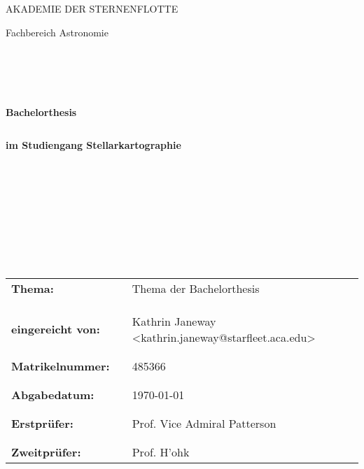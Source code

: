 \begin{titlepage}
	\begin{center}
		\uppercase{\large Akademie der Sternenflotte}\\
	\end{center}
	\begin{center}
		\large Fachbereich Astronomie
	\end{center}
	\begin{verbatim}





	\end{verbatim}
	\begin{center}
		\textbf{\large Bachelorthesis}
	\end{center}
	\begin{verbatim}
	\end{verbatim}
	\begin{center}
		\textbf{im Studiengang Stellarkartographie}
	\end{center}
	\begin{verbatim}










	\end{verbatim}
	\begin{flushleft}
		\begin{tabular}{lll}
			\textbf{Thema:} & & {Thema der Bachelorthesis} \\
			& & \\
			& & \\
			& & \\
			\textbf{eingereicht von:} & & Kathrin Janeway <kathrin.janeway@starfleet.aca.edu>\\
			& & \\
			& & \\
			\textbf{Matrikelnummer:} & & 485366\\
			& & \\
			& & \\
			\textbf{Abgabedatum:} & & \today\\
			& & \\
			& & \\
			\textbf{Erstprüfer:} & & Prof. Vice Admiral Patterson \\
			& & \\
			& & \\
			\textbf{Zweitprüfer:} & & Prof. H'ohk
		\end{tabular}
	\end{flushleft}
\end{titlepage}